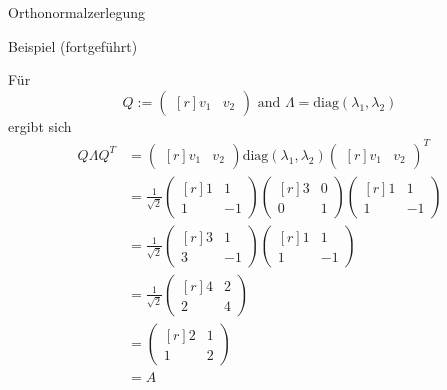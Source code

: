 \documentclass[
  8pt,
  ignorenonframetext,
]{beamer}
\begin{document}
\begin{frame}{Orthonormalzerlegung}
\protect\hypertarget{orthonormalzerlegung-2}{}

Beispiel (fortgeführt)

\footnotesize

Für \begin{equation}
Q := \begin{pmatrix*}[r]
v_1 & v_2
\end{pmatrix*}
\mbox{ and }
\Lambda = \mbox{diag}(\lambda_1,\lambda_2)
\end{equation} ergibt sich \begin{align*}
Q\Lambda Q^T
& =
\begin{pmatrix*}[r]
v_1 & v_2
\end{pmatrix*}
\mbox{diag}(\lambda_1,\lambda_2)
\begin{pmatrix*}[r]
v_1 & v_2
\end{pmatrix*}^T \\
& =
\frac{1}{\sqrt{2}}
\begin{pmatrix*}[r]
1 &  1\\
1 & -1
\end{pmatrix*}
\begin{pmatrix*}[r]
3 & 0 \\
0 & 1
\end{pmatrix*}
\begin{pmatrix*}[r]
1 &  1 \\
1 & -1
\end{pmatrix*}  \\
& =
\frac{1}{\sqrt{2}}
\begin{pmatrix*}[r]
3 & 1 \\
3 & -1
\end{pmatrix*}
\begin{pmatrix*}[r]
1 &  1 \\
1 & -1
\end{pmatrix*} \\
& =
\frac{1}{\sqrt{2}}
\begin{pmatrix*}[r]
4 & 2 \\
2 & 4
\end{pmatrix*} \\
& =
\begin{pmatrix*}[r]
2 & 1 \\
1 & 2
\end{pmatrix*} \\
& = A
\end{align*}
\end{frame}
\end{document}
